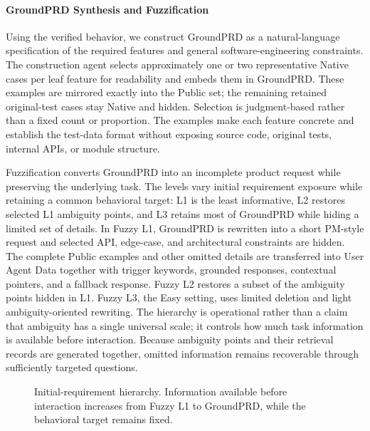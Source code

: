 \paragraph{GroundPRD Synthesis and Fuzzification}
Using the verified behavior, we construct GroundPRD as a natural-language specification of the required features and general software-engineering constraints. The construction agent selects approximately one or two representative Native cases per leaf feature for readability and embeds them in GroundPRD. These examples are mirrored exactly into the Public set; the remaining retained original-test cases stay Native and hidden. Selection is judgment-based rather than a fixed count or proportion. The examples make each feature concrete and establish the test-data format without exposing source code, original tests, internal APIs, or module structure.

Fuzzification converts GroundPRD into an incomplete product request while preserving the underlying task. The levels vary initial requirement exposure while retaining a common behavioral target: L1 is the least informative, L2 restores selected L1 ambiguity points, and L3 retains most of GroundPRD while hiding a limited set of details. In Fuzzy L1, GroundPRD is rewritten into a short PM-style request and selected API, edge-case, and architectural constraints are hidden. The complete Public examples and other omitted details are transferred into User Agent Data together with trigger keywords, grounded responses, contextual pointers, and a fallback response. Fuzzy L2 restores a subset of the ambiguity points hidden in L1. Fuzzy L3, the Easy setting, uses limited deletion and light ambiguity-oriented rewriting. The hierarchy is operational rather than a claim that ambiguity has a single universal scale; it controls how much task information is available before interaction. Because ambiguity points and their retrieval records are generated together, omitted information remains recoverable through sufficiently targeted questions.

\begin{figure}[t]
\centering
{}
\caption{Initial-requirement hierarchy. Information available before interaction increases from Fuzzy L1 to GroundPRD, while the behavioral target remains fixed.}
\label{fig:prd-hierarchy}
\end{figure}

